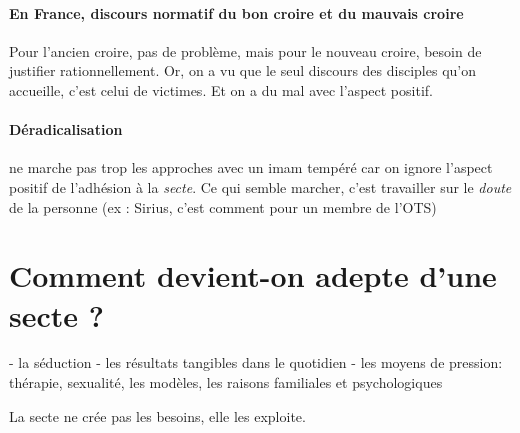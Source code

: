 \paragraph{En France, discours normatif du bon croire et du mauvais croire} Pour l'ancien croire, pas de problème, mais pour le nouveau croire, besoin de justifier rationnellement.
Or, on a vu que le seul discours des disciples qu'on accueille, c'est celui de victimes. Et on a du mal avec l'aspect positif.

\paragraph{Déradicalisation} ne marche pas trop les approches avec un imam tempéré car on ignore l'aspect positif de l'adhésion à la \textit{secte}. Ce qui semble marcher, c'est travailler sur le \textit{doute} de la personne (ex : Sirius, c'est comment pour un membre de l'OTS)

\section{Comment devient-on adepte d’une secte ?}

- la séduction
- les résultats tangibles dans le quotidien
- les moyens de pression: thérapie, sexualité, les modèles, les raisons familiales et
psychologiques

\begin{Synthesis}
La secte ne crée pas les besoins, elle les exploite.
\end{Synthesis}

